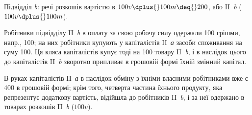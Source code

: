 Підвідділ \emph{b}: речі розкошів вартістю в $100 v \dplus{} 100 m \deq{} 200$, або
II~\emph{b} ($100 v \dplus{} 100 m$).

Робітники підвідділу II~\emph{b} в оплату за свою робочу силу одержали
100 грішми, напр., 100; на них робітники купують у капіталістів
II~\emph{а} засоби споживання на суму 100. Ця кляса капіталістів купує
тоді на 100 товару II~\emph{b}, і в наслідок цього до капіталістів II~\emph{b}
зворотно припливає в грошовій формі їхній змінний капітал.

В руках капіталістів II~\emph{а} в наслідок обміну з їхніми власними робітниками
вже є 400 в грошовій формі; крім того, четверта частина їхнього
продукту, яка репрезентує додаткову вартість, відійшла до робітників
II~\emph{b}, і за неї одержано в товарах розкошів II~\emph{b} ($100 v$).
